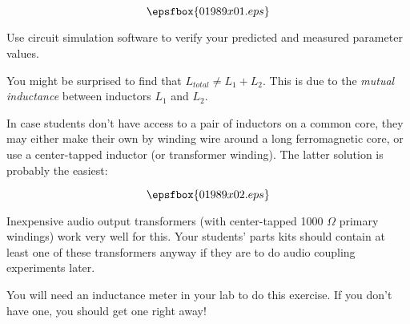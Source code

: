 

$$\epsfbox{01989x01.eps}$$

\vfil \eject






Use circuit simulation software to verify your predicted and measured parameter values.

\vskip 10pt

You might be surprised to find that $L_{total} \neq L_1 + L_2$.  This is due to the {\it mutual inductance} between inductors $L_1$ and $L_2$.







In case students don't have access to a pair of inductors on a common core, they may either make their own by winding wire around a long ferromagnetic core, or use a center-tapped inductor (or transformer winding).  The latter solution is probably the easiest:

$$\epsfbox{01989x02.eps}$$

Inexpensive audio output transformers (with center-tapped 1000 $\Omega$ primary windings) work very well for this.  Your students' parts kits should contain at least one of these transformers anyway if they are to do audio coupling experiments later.

\vskip 10pt

You will need an inductance meter in your lab to do this exercise.  If you don't have one, you should get one right away!




